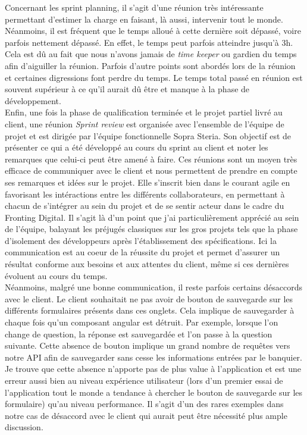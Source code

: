 	Concernant les sprint planning, il s'agit d'une réunion très intéressante permettant d'estimer la charge en faisant, là aussi, intervenir tout le monde. Néanmoins, il est fréquent que le temps alloué à cette dernière soit dépassé, voire parfois nettement dépassé. En effet, le temps peut parfois atteindre jusqu'à 3h. Cela est dû au fait que nous n'avons jamais de \textit{time keeper} ou gardien du temps afin d'aiguiller la réunion. Parfois d'autre points sont abordés lors de la réunion et certaines digressions font perdre du temps. Le temps total passé en réunion est souvent supérieur à ce qu'il aurait dû être et manque à la phase de développement. \\
	
	Enfin, une fois la phase de qualification terminée et le projet partiel livré au client, une réunion \textit{Sprint review} est organisée avec l'ensemble de l'équipe de projet et est dirigée par l'équipe fonctionnelle Sopra Steria. Son objectif est de présenter ce qui a été développé au cours du sprint au client et noter les remarques que celui-ci peut être amené à faire. Ces réunions sont un moyen très efficace de communiquer avec le client et nous permettent de prendre en compte ses remarques et idées sur le projet. Elle s'inscrit bien dans le courant agile en favorisant les intéractions entre les différents collaborateurs, en permettant à chacun de s'intégrer au sein du projet et de se sentir acteur dans le cadre du Fronting Digital. Il s'agit là d'un point que j'ai particulièrement apprécié au sein de l'équipe, balayant les préjugés classiques sur les gros projets tels que la phase d'isolement des développeurs après l'établissement des spécifications. Ici la communication est au coeur de la réussite du projet et permet d'assurer un résultat conforme aux besoins et aux attentes du client, même si ces dernières évoluent au cours du temps. \\
	
	Néanmoins, malgré une bonne communication, il reste parfois certains désaccords avec le client. Le client souhaitait ne pas avoir de bouton de sauvegarde sur les différents formulaires présents dans ces onglets. Cela implique de sauvegarder à chaque fois qu'un composant angular est détruit. Par exemple, lorsque l'on change de question, la réponse est sauvegardée et l'on passe à la question suivante. Cette absence de bouton implique un grand nombre de requêtes vers notre API afin de sauvegarder sans cesse les informations entrées par le banquier. Je trouve que cette absence n'apporte pas de plus value à l'application et est une erreur aussi bien au niveau expérience utilisateur (lors d'un premier essai de l'application tout le monde a tendance à chercher le bouton de sauvegarde sur les formulaire) qu'au niveau performance. Il s'agit d'un des rares exemples dans notre cas de désaccord avec le client qui aurait peut être nécessité plus ample discussion.